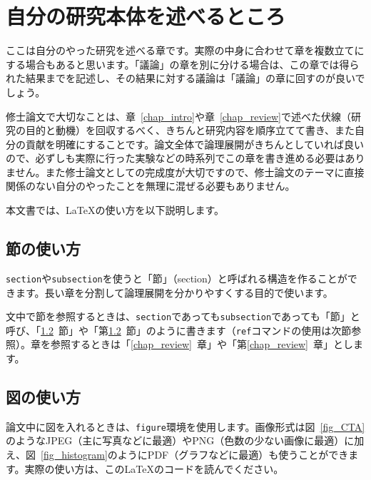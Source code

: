 \chapter{自分の研究本体を述べるところ}
ここは自分のやった研究を述べる章です。実際の中身に合わせて章を複数立てにする場合もあると思います。「議論」の章を別に分ける場合は、この章では得られた結果までを記述し、その結果に対する議論は「議論」の章に回すのが良いでしょう。

修士論文で大切なことは、章~\ref{chap_intro}や章~\ref{chap_review}で述べた伏線（研究の目的と動機）を回収するべく、きちんと研究内容を順序立てて書き、また自分の貢献を明確にすることです。論文全体で論理展開がきちんとしていれば良いので、必ずしも実際に行った実験などの時系列でこの章を書き進める必要はありません。また修士論文としての完成度が大切ですので、修士論文のテーマに直接関係のない自分のやったことを無理に混ぜる必要もありません。

本文書では、\LaTeX{}の使い方を以下説明します。

\section{節の使い方}
\texttt{section}や\texttt{subsection}を使うと「節」（section）と呼ばれる構造を作ることができます。長い章を分割して論理展開を分かりやすくする目的で使います。

文中で節を参照するときは、\texttt{section}であっても\texttt{subsection}であっても「節」と呼び、「\ref{sec_figure}~節」や「第\ref{sec_figure}~節」のように書きます（\texttt{ref}コマンドの使用は次節参照）。章を参照するときは「\ref{chap_review}~章」や「第\ref{chap_review}~章」とします。

\section{図の使い方}
\label{sec_figure} %

論文中に図を入れるときは、\texttt{figure}環境を使用します。画像形式は図~\ref{fig_CTA}のようなJPEG（主に写真などに最適）やPNG（色数の少ない画像に最適）に加え、図~\ref{fig_histogram}のようにPDF（グラフなどに最適）も使うことができます。実際の使い方は、この\LaTeX{}のコードを読んでください。

